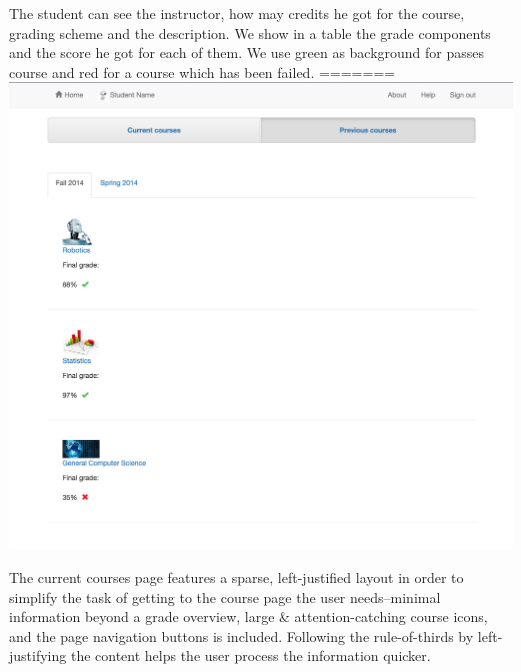 The student can see the instructor, how may credits he got for the course, grading scheme and the description. We show in a table the grade components and the score he got for each of them. We use green as background for passes course and red for a course which has been failed.
=======
\includegraphics[width=\textwidth]{screenshots/PreviousCourses.png}

The current courses page features a sparse, left-justified layout in order to simplify the task of getting to the course page the user needs--minimal information beyond a grade overview, large \& attention-catching course icons, and the page navigation buttons is included. Following the rule-of-thirds by left-justifying the content helps the user process the information quicker.
